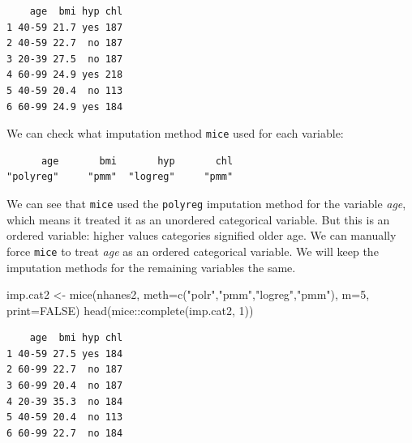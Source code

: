 \documentclass[
  letterpaper,
  DIV=11,
  numbers=noendperiod]{scrreprt}
\newenvironment{Shaded}{}{}
\newcommand{\AttributeTok}[1]{\textcolor[rgb]{0.49,0.56,0.16}{#1}}
\newcommand{\ConstantTok}[1]{\textcolor[rgb]{0.53,0.00,0.00}{#1}}
\newcommand{\DecValTok}[1]{\textcolor[rgb]{0.25,0.63,0.44}{#1}}
\newcommand{\FunctionTok}[1]{\textcolor[rgb]{0.02,0.16,0.49}{#1}}
\newcommand{\NormalTok}[1]{#1}
\newcommand{\OtherTok}[1]{\textcolor[rgb]{0.00,0.44,0.13}{#1}}
\newcommand{\SpecialCharTok}[1]{\textcolor[rgb]{0.25,0.44,0.63}{#1}}
\newcommand{\StringTok}[1]{\textcolor[rgb]{0.25,0.44,0.63}{#1}}
\begin{document}
\begin{verbatim}
    age  bmi hyp chl
1 40-59 21.7 yes 187
2 40-59 22.7  no 187
3 20-39 27.5  no 187
4 60-99 24.9 yes 218
5 40-59 20.4  no 113
6 60-99 24.9 yes 184
\end{verbatim}

We can check what imputation method \texttt{mice} used for each
variable:

\begin{Shaded}
\end{Shaded}

\begin{verbatim}
      age       bmi       hyp       chl 
"polyreg"     "pmm"  "logreg"     "pmm" 
\end{verbatim}

We can see that \texttt{mice} used the \texttt{polyreg} imputation
method for the variable \emph{age}, which means it treated it as an
unordered categorical variable. But this is an ordered variable: higher
values categories signified older age. We can manually force
\texttt{mice} to treat \emph{age} as an ordered categorical variable. We
will keep the imputation methods for the remaining variables the same.

\begin{Shaded}
\begin{Highlighting}[]
\NormalTok{  imp.cat2 }\OtherTok{\textless{}{-}} \FunctionTok{mice}\NormalTok{(nhanes2, }\AttributeTok{meth=}\FunctionTok{c}\NormalTok{(}\StringTok{"polr"}\NormalTok{,}\StringTok{"pmm"}\NormalTok{,}\StringTok{"logreg"}\NormalTok{,}\StringTok{"pmm"}\NormalTok{), }\AttributeTok{m=}\DecValTok{5}\NormalTok{, }\AttributeTok{print=}\ConstantTok{FALSE}\NormalTok{)}
  \FunctionTok{head}\NormalTok{(mice}\SpecialCharTok{::}\FunctionTok{complete}\NormalTok{(imp.cat2, }\DecValTok{1}\NormalTok{))}
\end{Highlighting}
\end{Shaded}

\begin{verbatim}
    age  bmi hyp chl
1 40-59 27.5 yes 184
2 60-99 22.7  no 187
3 60-99 20.4  no 187
4 20-39 35.3  no 184
5 40-59 20.4  no 113
6 60-99 22.7  no 184
\end{verbatim}

\begin{Shaded}
\end{Shaded}
\end{document}

